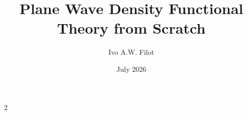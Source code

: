 \documentclass[9pt]{extarticle}
\title{Plane Wave Density Functional Theory from Scratch}
\author{Ivo A.W. Filot}
\date{July 2026}
\begin{document}
\maketitle

\pagestyle{fancy}
\lfoot{}
\cfoot{\thepage}

\begin{multicols*}{2}
    \tableofcontents

    
    
    
    
    
    
    
    

    \printbibliography

\end{multicols*}
\end{document}
